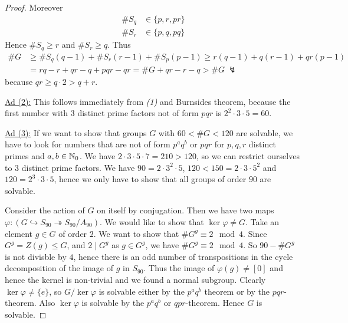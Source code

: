 \documentclass[twoside = false,	%
		headsepline,		%
		parskip = true,
		]{scrbook}						%
\begin{document}
\begin{proof}
        Moreover
        \begin{equation*}
        \begin{split}
            \#S_q &\in \{p,r,pr\} \\
            \#S_r &\in \{p,q,pq\}
        \end{split}
        \end{equation*}
        Hence $\#S_q \geq r$ and $\#S_r \geq q$. Thus
        \begin{equation*}
        \begin{split}
            \#G &\geq \#S_q (q-1) + \#S_r(r-1) + \#S_p(p-1) \geq r(q-1) + q(r-1) + qr(p-1) \\
            &= rq - r +qr - q + pqr - qr = \#G + qr - r - q > \#G \ \lightning 
        \end{split}
        \end{equation*}
        because $qr \geq q \cdot 2 > q + r$.
        
    \underline{Ad (2):}
        This follows immediately from \textit{(1)} and Burnsides theorem, because the first number with $3$ distinct prime factors not of form $pqr$ is $2^2 \cdot 3 \cdot 5 = 60$.
        
    \underline{Ad (3):}
        If we want to show that groups $G$ with $60<\#G<120$ are solvable, we have to look for numbers that are not of form $p^a q^b$ or $pqr$ for $p,q,r$ distinct primes and $a,b \in \mathbb N_0$. We have $2 \cdot 3 \cdot 5 \cdot 7 = 210 > 120$, so we can restrict ourselves to $3$ distinct prime factors. We have $90 = 2 \cdot 3^2 \cdot 5$, $120 < 150 = 2 \cdot 3 \cdot 5^2$ and $120 = 2^3 \cdot 3 \cdot 5 $, hence we only have to show that all groups of order $90$ are solvable.
        
        Consider the action of $G$ on itself by conjugation. Then we have two maps $\varphi:(G \hookrightarrow S_{90} \twoheadrightarrow S_{90}/A_{90})$. We would like to show that $\ker \varphi \neq G$. Take an element $g\in G$ of order $2$. We want to show that $\# G^g \equiv 2 \mod 4$. Since $G^g = Z(g) \leq G$, and $2 \mid G^g$ as $g \in G^g$, we have $\#G^g \equiv 2 \mod 4$. So $90 - \#G^g$ is not divisble by $4$, hence there is an odd number of transpositions in the cycle decomposition of the image of $g$ in $S_{90}$. Thus the image of $\varphi(g) \neq [0]$ and hence the kernel is non-trivial and we found a normal subgroup. Clearly $\ker \varphi \neq \{e\}$, so $G/\ker \varphi$ is solvable either by the $p^a q^b$ theorem or by the $pqr$-theorem. Also $\ker \varphi$ is solvable by the $p^aq^b$ or $qpr$-theorem. Hence $G$ is solvable.
        
    \end{proof}
    
\end{document}
